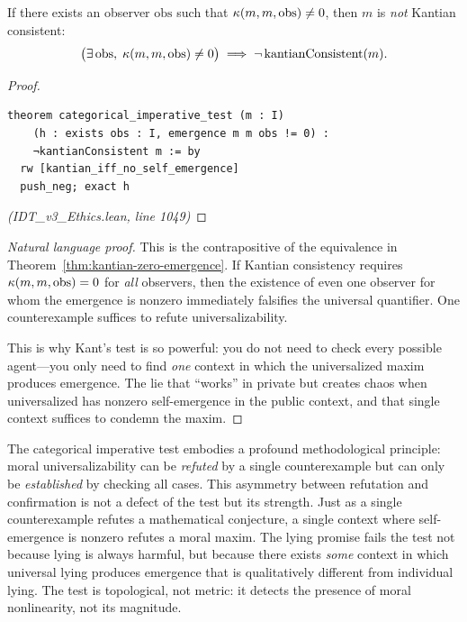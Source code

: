 \begin{theorem}
\label{thm:categorical-test}
If there exists an observer $\mathrm{obs}$ such that $\kappa(m, m, \mathrm{obs})
\neq 0$, then $m$ is \emph{not} Kantian consistent:
\[
  \bigl(\exists\, \mathrm{obs},\; \kappa(m, m, \mathrm{obs}) \neq 0\bigr)
  \implies \neg\, \mathrm{kantianConsistent}(m).
\]
\end{theorem}

\begin{proof}
\begin{lstlisting}
theorem categorical_imperative_test (m : I)
    (h : exists obs : I, emergence m m obs != 0) :
    ¬kantianConsistent m := by
  rw [kantian_iff_no_self_emergence]
  push_neg; exact h
\end{lstlisting}
\textit{(IDT\_v3\_Ethics.lean, line 1049)}
\end{proof}

\begin{proof}[Natural language proof]
This is the contrapositive of the equivalence in
Theorem~\ref{thm:kantian-zero-emergence}. If Kantian consistency requires
$\kappa(m,m,\mathrm{obs}) = 0$ for \emph{all} observers, then the existence
of even one observer for whom the emergence is nonzero immediately falsifies
the universal quantifier. One counterexample suffices to refute universalizability.

This is why Kant's test is so powerful: you do not need to check every
possible agent---you only need to find \emph{one} context in which the
universalized maxim produces emergence. The lie that ``works'' in private
but creates chaos when universalized has nonzero self-emergence in the
public context, and that single context suffices to condemn the maxim.
\end{proof}

\begin{interpretation}
The categorical imperative test embodies a profound methodological principle:
moral universalizability can be \emph{refuted} by a single counterexample
but can only be \emph{established} by checking all cases. This asymmetry
between refutation and confirmation is not a defect of the test but its
strength. Just as a single counterexample refutes a mathematical conjecture,
a single context where self-emergence is nonzero refutes a moral maxim.
The lying promise fails the test not because lying is always harmful, but
because there exists \emph{some} context in which universal lying produces
emergence that is qualitatively different from individual lying. The test
is topological, not metric: it detects the presence of moral nonlinearity,
not its magnitude.
\end{interpretation}

